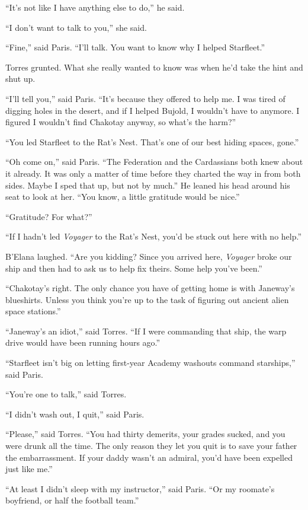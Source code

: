 \documentclass[twoside,letterpaper,12pt]{memoir}
\begin{document}
``It's not like I have anything else to do,'' he said.

``I don't want to talk to you,'' she said.

``Fine,'' said Paris. ``I'll talk. You want to know why I helped Starfleet.''

Torres grunted. What she really wanted to know was when he'd take the hint and shut up.

``I'll tell you,'' said Paris. ``It's because they offered to help me. I was tired of digging holes in the desert, and if I helped Bujold, I wouldn't have to anymore. I figured I wouldn't find Chakotay anyway, so what's the harm?''

``You led Starfleet to the Rat's Nest. That's one of our best hiding spaces, gone.''

``Oh come on,'' said Paris. ``The Federation and the Cardassians both knew about it already. It was only a matter of time before they charted the way in from both sides. Maybe I sped that up, but not by much.'' He leaned his head around his seat to look at her. ``You know, a little gratitude would be nice.''

``Gratitude? For what?''

``If I hadn't led \textit{Voyager} to the Rat's Nest, you'd be stuck out here with no help.''

B'Elana laughed. ``Are you kidding? Since you arrived here, \textit{Voyager} broke our ship and then had to ask us to help fix theirs. Some help you've been.''

``Chakotay's right. The only chance you have of getting home is with Janeway's blueshirts. Unless you think you're up to the task of figuring out ancient alien space stations.''

``Janeway's an idiot,'' said Torres. ``If I were commanding that ship, the warp drive would have been running hours ago.''

``Starfleet isn't big on letting first-year Academy washouts command starships,'' said Paris.

``You're one to talk,'' said Torres.

``I didn't wash out, I quit,'' said Paris.

``Please,'' said Torres. ``You had thirty demerits, your grades sucked, and you were drunk all the time. The only reason they let you quit is to save your father the embarrassment. If your daddy wasn't an admiral, you'd have been expelled just like me.''

``At least I didn't sleep with my instructor,'' said Paris. ``Or my roomate’s boyfriend, or half the football team.''
\end{document}
